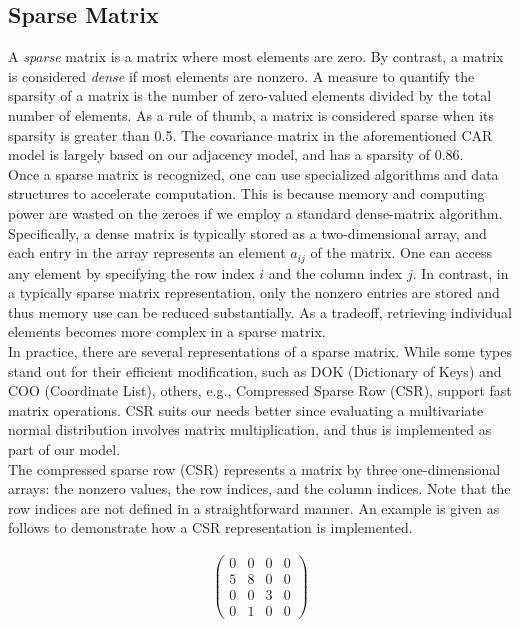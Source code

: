 \documentclass{svjour3}
\begin{document}
\subsection{Sparse Matrix}\label{subsec:sparse}

A \emph{sparse} matrix is a matrix where most elements are zero.
By contrast, a matrix is considered \emph{dense} if most elements are nonzero.
A measure to quantify the sparsity of a matrix is the number of zero-valued elements divided by the total number of elements.
As a rule of thumb, a matrix is considered sparse when its sparsity is greater than 0.5. The covariance matrix in the aforementioned CAR model is largely based on our adjacency model, and has a sparsity of 0.86.\\

Once a sparse matrix is recognized, one can use specialized algorithms and data structures to accelerate computation.
This is because memory and computing power are wasted on the zeroes if we employ a standard dense-matrix algorithm.
Specifically, a dense matrix is typically stored as a two-dimensional array, and each entry in the array represents an element $ a_{ij}$ of the matrix.
One can access any element by specifying the row index $i$ and the column index $j$.
In contrast, in a typically sparse matrix representation, only the nonzero entries are stored and thus memory use can be reduced substantially.
As a tradeoff, retrieving individual elements becomes more complex in a sparse matrix.\\

In practice, there are several representations of a sparse matrix.
While some types stand out for their efficient modification, such as DOK (Dictionary of Keys) and COO (Coordinate List), others, e.g., Compressed Sparse Row (CSR), support fast matrix operations.
CSR suits our needs better since evaluating a multivariate normal distribution involves matrix multiplication, and thus is implemented as part of our model. \\

The compressed sparse row (CSR) represents a matrix by three one-dimensional arrays: the nonzero values, the row indices, and the column indices.
Note that the row indices are not defined in a straightforward manner.
An example is given as follows to demonstrate how a CSR representation is implemented.

\begin{align*}
\left(
\begin{matrix}
  0 & 0 & 0 & 0 \\
  5 & 8 & 0 & 0 \\
  0 & 0 & 3 & 0 \\
  0 & 1 & 0 & 0
\end{matrix}
\right)
\end{align*}
\end{document}
